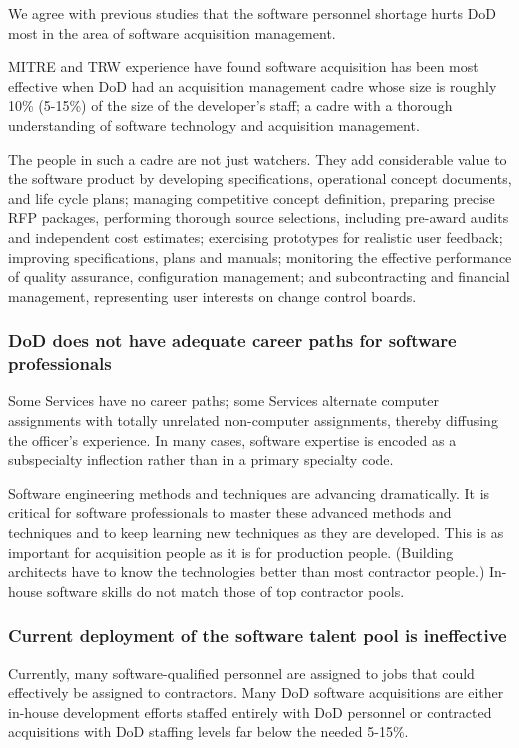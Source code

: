 \documentclass[12pt,final]{article}
\begin{document}
We agree with previous studies that the software personnel shortage hurts DoD
most in the area of software acquisition management.

MITRE and TRW experience have found software acquisition has been most
effective when DoD had an acquisition management cadre whose size is roughly
10\% (5-15\%) of the size of the developer’s staff; a cadre with a thorough
understanding of software technology and acquisition management.

The people in such a cadre are not just watchers. They add considerable value
to the software product by developing specifications, operational concept
documents, and life cycle plans; managing competitive concept definition,
preparing precise RFP packages, performing thorough source selections,
including pre-award audits and independent cost estimates; exercising
prototypes for realistic user feedback; improving specifications, plans and
manuals; monitoring the effective performance of quality assurance,
configuration management; and subcontracting and financial management,
representing user interests on change control boards.

\subsubsection*{DoD does not have adequate career paths for software professionals}

Some Services have no career paths; some Services alternate computer
assignments with totally unrelated non-computer assignments, thereby diffusing
the officer’s experience. In many cases, software expertise is encoded as a
subspecialty inflection rather than in a primary specialty code.

Software engineering methods and techniques are advancing dramatically. It is
critical for software professionals to master these advanced methods and
techniques and to keep learning new techniques as they are developed. This is
as important for acquisition people as it is for production people. (Building
architects have to know the technologies better than most contractor people.)
In-house software skills do not match those of top contractor pools.

\subsubsection*{Current deployment of the software talent pool is ineffective}

Currently, many software-qualified personnel are assigned to jobs that could
effectively be assigned to contractors. Many DoD software acquisitions are
either in-house development efforts staffed entirely with DoD personnel or
contracted acquisitions with DoD staffing levels far below the needed 5-15\%.
\end{document}
